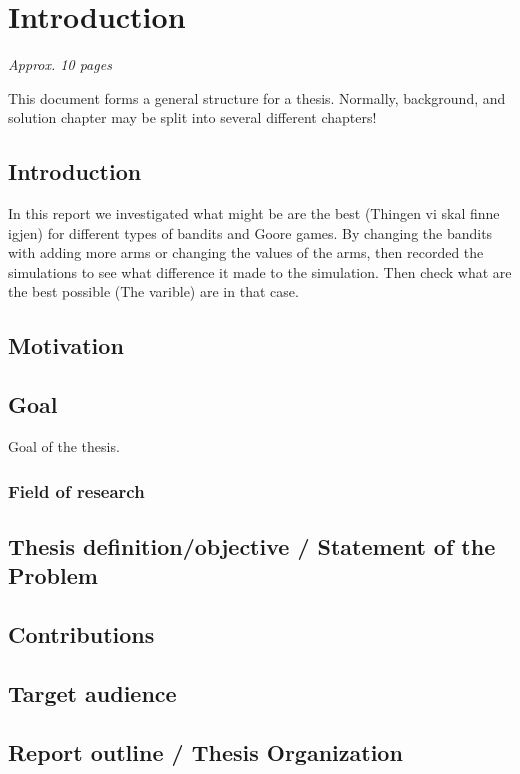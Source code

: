 \chapter{Introduction}
\label{ch:introduction}

\textit{Approx. 10 pages}

This document forms a general structure for a thesis.
Normally, background, and solution chapter may be split into several different chapters!

\section{Introduction}
In this report we investigated what might be are the best (Thingen vi skal finne igjen) for different types of bandits and Goore games. By changing the bandits with adding more arms or changing the values of the arms, then recorded the simulations to see what difference it made to the simulation. Then check what are the best possible (The varible) are in that case.
\section{Motivation}

\section{Goal}
Goal of the thesis.

\subsection{Field of research}

\section{Thesis definition/objective / Statement of the Problem}

\section{Contributions}
 
\section{Target audience}


\section{Report outline / Thesis Organization}
